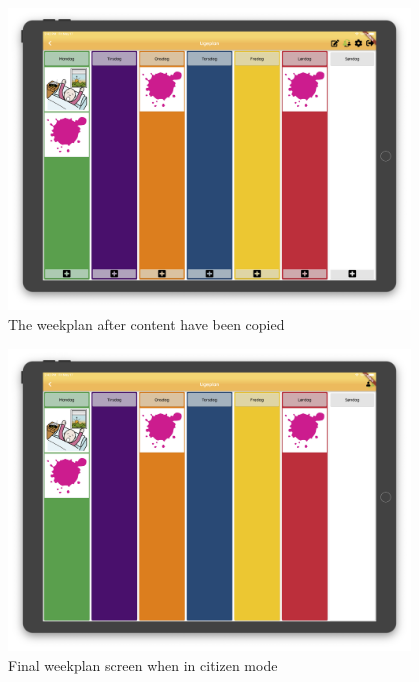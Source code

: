 \begin{figure}[H]
    \begin{center}
        \includegraphics[width=0.95\textwidth]{figures/FinalScreen/editWeekplanScreenAfterCopy.png}
    \end{center}
    \caption{The weekplan after content have been copied}
    \label{fig:finalWeekplanAfterCopy}
\end{figure}

\begin{figure}[H]
    \begin{center}
        \includegraphics[width=0.95\textwidth]{figures/FinalScreen/weekplanScreenCitizenMode.png}
    \end{center}
    \caption{Final weekplan screen when in citizen mode}
    \label{fig:finalWeekplanCitizenMode}
\end{figure}

